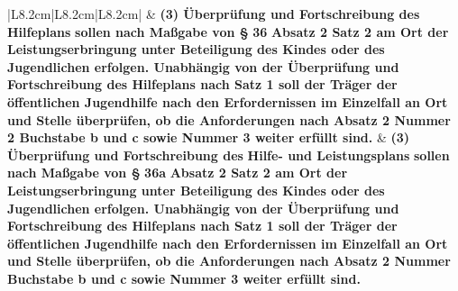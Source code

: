\documentclass[10pt,a4paper,landscape]{article}
\begin{document}
\begin{longtable}{|L{8.2cm}|L{8.2cm}|L{8.2cm}|}
 & \textbf{(3) Überprüfung und Fortschreibung des} \newline \textbf{\textcolor{diffred}{Hilfeplans}}\textbf{ sollen nach Maßgabe von \S{}} \newline \textbf{\textcolor{diffred}{36}}\textbf{ Absatz 2 Satz 2 am Ort der  \newline Leistungserbringung unter Beteiligung  \newline des Kindes oder des Jugendlichen  \newline erfolgen. Unabhängig von der  \newline Überprüfung und Fortschreibung des  \newline Hilfeplans nach Satz 1 soll der Träger  \newline der öffentlichen Jugendhilfe nach den  \newline Erfordernissen im Einzelfall an Ort und  \newline Stelle überprüfen, ob die Anforderungen  \newline nach Absatz 2 Nummer 2 Buchstabe b  \newline und c sowie Nummer 3 weiter erfüllt  \newline sind. } & \textbf{(3) Überprüfung und Fortschreibung des} \newline \textbf{\textcolor{diffgreen}{Hilfe- und Leistungsplans}}\textbf{ sollen nach  \newline Maßgabe von \S{} }\textbf{\textcolor{diffgreen}{36a}}\textbf{ Absatz 2 Satz 2 am  \newline Ort der Leistungserbringung unter  \newline Beteiligung des Kindes oder des  \newline Jugendlichen erfolgen. Unabhängig von  \newline der Überprüfung und Fortschreibung  \newline des Hilfeplans nach Satz 1 soll der  \newline Träger der öffentlichen Jugendhilfe  \newline nach den Erfordernissen im Einzelfall an  \newline Ort und Stelle überprüfen, ob die  \newline Anforderungen nach Absatz 2 Nummer   Buchstabe b und c sowie Nummer 3  \newline weiter erfüllt sind. } \\
\hhline{|---|}

\end{longtable}
\end{document}
